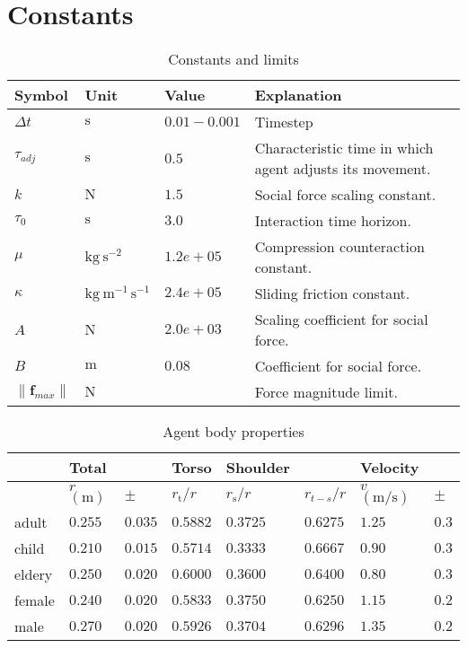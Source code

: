 \section{Constants}

\begin{table}[H]
\begin{tabular}{ lll|l }
\hline
Symbol         & Unit & Value & Explanation \\
\hline
\hline
$ \Delta t $ & $ \mathrm{s} $ & $ 0.01-0.001 $ & Timestep \\
\hline
\hline
$ \tau_{adj} $ & $ \mathrm{s} $ & $ 0.5 $ & Characteristic time in which agent adjusts its movement. \\
$ k $          & $ \mathrm{N} $ & $ 1.5 $ & Social force scaling constant. \\
$ \tau_{0} $   & $ \mathrm{s} $ & $ 3.0 $ & Interaction time horizon. \\
$ \mu $        & $ \mathrm{kg \ s^{-2}} $ & $ 1.2e+05 $ & Compression counteraction constant. \\
$ \kappa $     & $ \mathrm{kg \ m^{-1}\,s^{-1}} $ & $ 2.4e+05 $ & Sliding friction constant. \\
$ A $          & $ \mathrm{N} $ & $ 2.0e+03 $ & Scaling coefficient for social force. \\
$ B $          & $ \mathrm{m} $ & $ 0.08 $ & Coefficient for social force. \\
\hline
\hline
$ \left\|\mathbf{f}_{max}\right\| $    & $ \mathrm{N} $ &  & Force magnitude limit. \\
\hline
\end{tabular} 
\caption{Constants and limits}
\end{table}

\begin{table}[H]
\begin{tabular}{l|lllllll}
& Total && Torso & Shoulder &  & Velocity &  \\
\hline
& $ r $ $ (\mathrm{m}) $ & $ \pm $ & $ r_{\text{t}} / r $ & $ r_{\text{s}} / r $ & $ r_{t-s} / r $ & $ v $ $ (\mathrm{m} / \mathrm{s}) $ & $ \pm $ \\
\hline\hline
adult & $ 0.255 $ & $ 0.035 $ & $ 0.5882 $ & $ 0.3725 $ & $ 0.6275 $ & $ 1.25 $ & $ 0.3 $ \\
child & $ 0.210 $ & $ 0.015 $ & $ 0.5714 $ & $ 0.3333 $ & $ 0.6667 $ & $ 0.90 $ & $ 0.3 $ \\
eldery & $ 0.250 $ & $ 0.020 $ & $ 0.6000 $ & $ 0.3600 $ & $ 0.6400 $ & $ 0.80 $ & $ 0.3 $ \\
female & $ 0.240 $ & $ 0.020 $ & $ 0.5833 $ & $ 0.3750 $ & $ 0.6250 $ & $ 1.15 $ & $ 0.2 $ \\
male & $ 0.270 $ & $ 0.020 $ & $ 0.5926 $ & $ 0.3704 $ & $ 0.6296 $ & $ 1.35 $ & $ 0.2 $ \\
\hline
\end{tabular} 
\caption{Agent body properties}
\end{table} 
